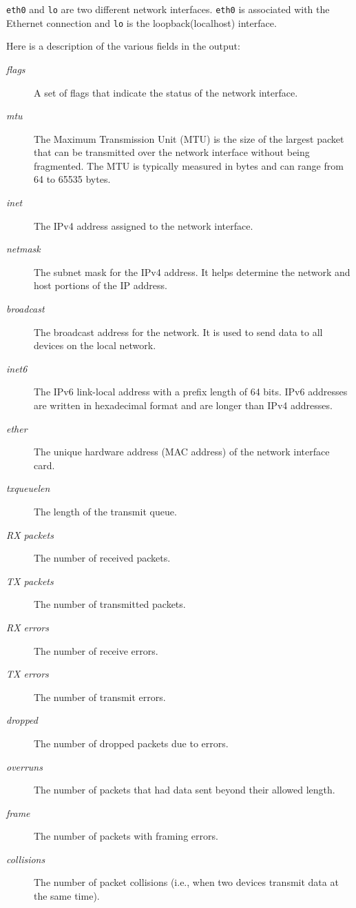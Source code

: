 
    {\tt eth0} and {\tt lo} are two different network interfaces. {\tt eth0} is associated with the Ethernet connection and {\tt lo} is the loopback(localhost) interface.

    Here is a description of the various fields in the output:
    \begin{description}
        \item[\textit{flags}] A set of flags that indicate the status of the network interface. 
        \item[\textit{mtu}] The Maximum Transmission Unit (MTU) is the size of the largest packet that can be transmitted over the network interface without being fragmented. The MTU is typically measured in bytes and can range from 64 to 65535 bytes.
        \item[\textit{inet}] The IPv4 address assigned to the network interface.
        \item[\textit{netmask}] The subnet mask for the IPv4 address. It helps determine the network and host portions of the IP address.
        \item[\textit{broadcast}] The broadcast address for the network. It is used to send data to all devices on the local network.
        \item[\textit{inet6}] The IPv6 link-local address with a prefix length of 64 bits. IPv6 addresses are written in hexadecimal format and are longer than IPv4 addresses.
        \item[\textit{ether}] The unique hardware address (MAC address) of the network interface card.
        \item[\textit{txqueuelen}] The length of the transmit queue.
        \item[\textit{RX packets}] The number of received packets.
        \item[\textit{TX packets}] The number of transmitted packets.
        \item[\textit{RX errors}] The number of receive errors.
        \item[\textit{TX errors}] The number of transmit errors.
        \item[\textit{dropped}] The number of dropped packets due to errors.
        \item[\textit{overruns}] The number of packets that had data sent beyond their allowed length.
        \item[\textit{frame}] The number of packets with framing errors.
        \item[\textit{collisions}] The number of packet collisions (i.e., when two devices transmit data at the same time).
    \end{description}
    
